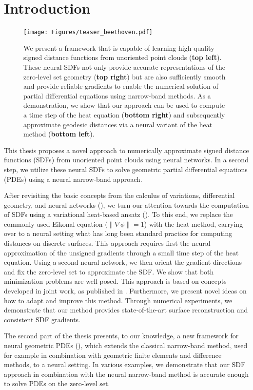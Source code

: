 \documentclass[12pt,openany]{book}
\theoremstyle{plainnormal}
\theoremstyle{remark}
\begin{document}
\section{Introduction}
\begin{figure}
    \centering
    \texttt{[image: Figures/teaser\_beethoven.pdf]}
    \caption{We present a framework that is capable of learning high-quality signed distance functions from unoriented point clouds (\textbf{top left}). These neural SDFs not only provide accurate representations of the zero-level set geometry (\textbf{top right}) but are also sufficiently smooth and provide reliable gradients to enable the numerical solution of partial differential equations using narrow-band methods. As a demonstration, we show that our approach can be used to compute a time step of the heat equation (\textbf{bottom right}) and subsequently approximate geodesic distances via a neural variant of the heat method (\textbf{bottom left}). }
    \label{teaser}
\end{figure}
This thesis proposes a novel approach to numerically approximate signed distance functions (SDFs) from unoriented point clouds using neural networks. In a second step, we utilize these neural SDFs to solve geometric partial differential equations (PDEs) using a neural narrow-band approach.\par
After revisiting the basic concepts from the calculus of variations, differential geometry, and neural networks (), we turn our attention towards the computation of SDFs using a variational heat-based ansatz (). To this end, we replace the commonly used Eikonal equation ($\|\nabla \phi\| = 1$) with the heat method, carrying over to a neural setting what has long been standard practice for computing distances on discrete surfaces. This approach requires first the neural approximation of the unsigned gradients through a small time step of the heat equation. Using a second neural network, we then orient the gradient directions and fix the zero-level set to approximate the SDF. We show that both minimization problems are well-posed. This approach is based on concepts developed in joint work, as published in \cite{weidemaier2025sdfsunorientedpointclouds}. Furthermore, we present novel ideas on how to adapt and improve this method. Through numerical experiments, we demonstrate that our method provides state-of-the-art surface reconstruction and consistent SDF gradients.\par
The second part of the thesis presents, to our knowledge, a new framework for neural geometric PDEs (), which extends the classical narrow-band method, used for example in combination with geometric finite elements and difference methods, to a neural setting. In various examples, we demonstrate that our SDF approach in combination with the neural narrow-band method is accurate enough to solve PDEs on the zero-level set.
\end{document}
